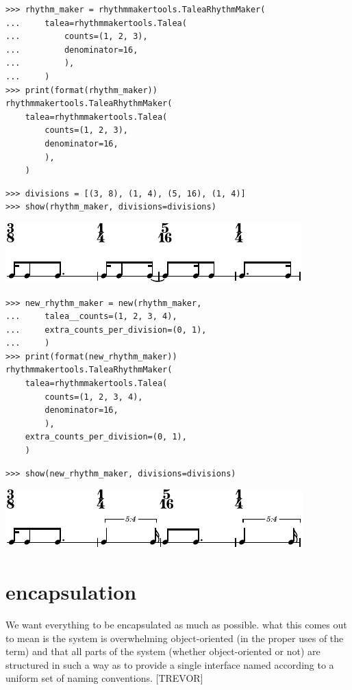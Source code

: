 \documentclass{article}
\begin{document}
\begin{lstlisting}
>>> rhythm_maker = rhythmmakertools.TaleaRhythmMaker(
...     talea=rhythmmakertools.Talea(
...         counts=(1, 2, 3),
...         denominator=16,
...         ),
...     )
>>> print(format(rhythm_maker))
rhythmmakertools.TaleaRhythmMaker(
    talea=rhythmmakertools.Talea(
        counts=(1, 2, 3),
        denominator=16,
        ),
    )
\end{lstlisting}


\begin{lstlisting}
>>> divisions = [(3, 8), (1, 4), (5, 16), (1, 4)]
>>> show(rhythm_maker, divisions=divisions)
\end{lstlisting}

\includegraphics[scale=1.0]{images/abjad-8.pdf}


\begin{lstlisting}
>>> new_rhythm_maker = new(rhythm_maker,
...     talea__counts=(1, 2, 3, 4),
...     extra_counts_per_division=(0, 1),
...     )
>>> print(format(new_rhythm_maker))
rhythmmakertools.TaleaRhythmMaker(
    talea=rhythmmakertools.Talea(
        counts=(1, 2, 3, 4),
        denominator=16,
        ),
    extra_counts_per_division=(0, 1),
    )
\end{lstlisting}


\begin{lstlisting}
>>> show(new_rhythm_maker, divisions=divisions)
\end{lstlisting}

\includegraphics[scale=1.0]{images/abjad-9.pdf}


\section{encapsulation}

We want everything to be encapsulated as much as possible. what this comes out
to mean is the system is overwhelming object-oriented (in the proper uses of
the term) and that all parts of the system (whether object-oriented or not) are
structured in such a way as to provide a single interface named according to a
uniform set of naming conventions. [TREVOR]
\end{document}
